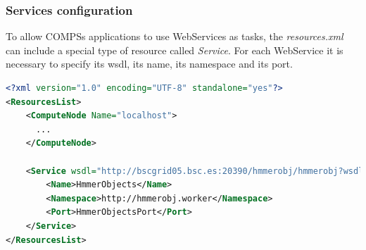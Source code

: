 \subsubsection{Services configuration}
To allow COMPSs applications to use WebServices as tasks, the \textit{resources.xml} can include a special type of resource called 
\textit{Service}. For each WebService it is necessary to specify its wsdl, its name, its namespace and
its port. 
\begin{lstlisting}[language=xml]
<?xml version="1.0" encoding="UTF-8" standalone="yes"?>
<ResourcesList>
    <ComputeNode Name="localhost">
      ...                                                                                                                                                                                                
    </ComputeNode>  
    
    <Service wsdl="http://bscgrid05.bsc.es:20390/hmmerobj/hmmerobj?wsdl">                                                                                                                                          
        <Name>HmmerObjects</Name>                                                                                                                                                                                  
        <Namespace>http://hmmerobj.worker</Namespace>                                                                                                                                                              
        <Port>HmmerObjectsPort</Port>                                                                                                                                                                              
    </Service>                                                                                                                                                                                                     
</ResourcesList>  
\end{lstlisting}

